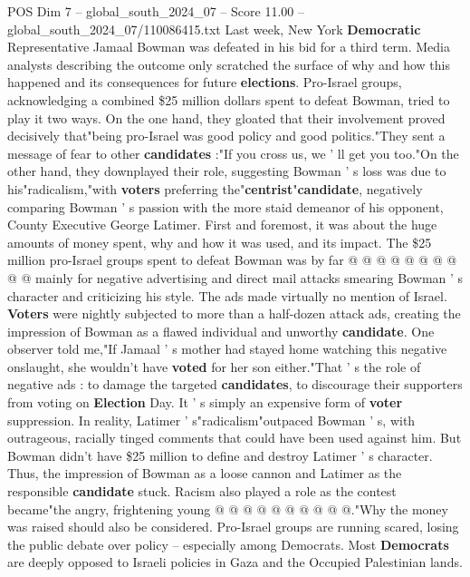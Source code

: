 \begin{textsample}{POS Dim 7 – global\_south\_2024\_07 – Score 11.00 – global\_south\_2024\_07/110086415.txt}  \label{ex:f7_pos_103}
Last week, New York \textbf{Democratic} Representative Jamaal Bowman was defeated in his bid for a third term.
Media analysts describing the outcome only scratched the surface of why and how this happened and its consequences for future \textbf{elections}.
Pro-Israel groups, acknowledging a combined \$25 million dollars spent to defeat Bowman, tried to play it two ways.
On the one hand, they gloated that their involvement proved decisively that"being pro-Israel was good policy and good politics."They sent a message of fear to other \textbf{candidates} :"If you cross us, we ' ll get you too."On the other hand, they downplayed their role, suggesting Bowman ' s loss was due to his"radicalism,"with \textbf{voters} preferring the"\textbf{centrist}"\textbf{candidate}, negatively comparing Bowman ' s passion with the more staid demeanor of his opponent, County Executive George Latimer.
First and foremost, it was about the huge amounts of money spent, why and how it was used, and its impact.
The \$25 million pro-Israel groups spent to defeat Bowman was by far @ @ @ @ @ @ @ @ @ @ mainly for negative advertising and direct mail attacks smearing Bowman ' s character and criticizing his style.
The ads made virtually no mention of Israel. \textbf{Voters} were nightly subjected to more than a half-dozen attack ads, creating the impression of Bowman as a flawed individual and unworthy \textbf{candidate}.
One observer told me,"If Jamaal ' s mother had stayed home watching this negative onslaught, she wouldn't have \textbf{voted} for her son either."That ' s the role of negative ads : to damage the targeted \textbf{candidates}, to discourage their supporters from voting on \textbf{Election} Day.
It ' s simply an expensive form of \textbf{voter} suppression.
In reality, Latimer ' s"radicalism"outpaced Bowman ' s, with outrageous, racially tinged comments that could have been used against him.
But Bowman didn't have \$25 million to define and destroy Latimer ' s character.
Thus, the impression of Bowman as a loose cannon and Latimer as the responsible \textbf{candidate} stuck.
Racism also played a role as the contest became"the angry, frightening young @ @ @ @ @ @ @ @ @ @."Why the money was raised should also be considered.
Pro-Israel groups are running scared, losing the public debate over policy -- especially among Democrats.
Most \textbf{Democrats} are deeply opposed to Israeli policies in Gaza and the Occupied Palestinian lands.

\end{textsample}
